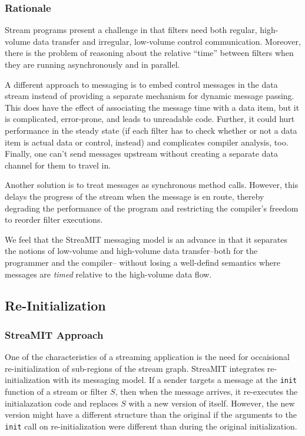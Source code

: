 \subsubsection{Rationale}

Stream programs present a challenge in that filters need both regular,
high-volume data transfer and irregular, low-volume control
communication.  Moreover, there is the problem of reasoning about the
relative ``time'' between filters when they are running asynchronously
and in parallel.

A different approach to messaging is to embed control messages in the
data stream instead of providing a separate mechanism for dynamic
message passing.  This does have the effect of associating the message
time with a data item, but it is complicated, error-prone, and leads
to unreadable code.  Further, it could hurt performance in the steady
state (if each filter has to check whether or not a data item is
actual data or control, instead) and complicates compiler analysis,
too.  Finally, one can't send messages upstream without creating a
separate data channel for them to travel in.

Another solution is to treat messages as synchronous method calls.
However, this delays the progress of the stream when the message is en
route, thereby degrading the performance of the program and
restricting the compiler's freedom to reorder filter executions.  

We feel that the StreaMIT messaging model is an advance in that it
separates the notions of low-volume and high-volume data
transfer--both for the programmer and the compiler-- without losing a
well-defind semantics where messages are {\it timed} relative to the
high-volume data flow.

\subsection{Re-Initialization}
\label{sec:reinit}

\subsubsection{StreaMIT Approach}

One of the characteristics of a streaming application is the need for
occaisional re-initialization of sub-regions of the stream graph.
StreaMIT integrates re-initialization with its messaging model.  If a
sender targets a message at the {\tt init} function of a stream or
filter $S$, then when the message arrives, it re-executes the
initialazation code and replaces $S$ with a new version of itself.
However, the new version might have a different structure than the
original if the arguments to the {\tt init} call on re-initialization
were different than during the original initialization.

